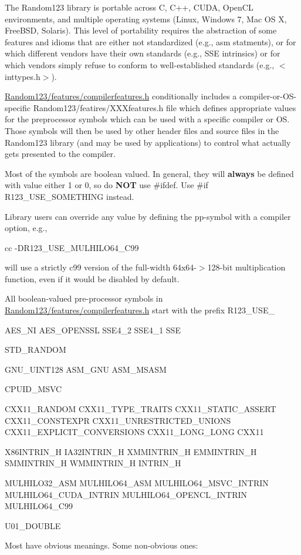 The Random123 library is portable across C, C++, C\+U\+DA, Open\+CL environments, and multiple operating systems (Linux, Windows 7, Mac OS X, Free\+B\+SD, Solaris). This level of portability requires the abstraction of some features and idioms that are either not standardized (e.\+g., asm statments), or for which different vendors have their own standards (e.\+g., S\+SE intrinsics) or for which vendors simply refuse to conform to well-\/established standards (e.\+g., $<$inttypes.\+h$>$).

\mbox{\hyperlink{compilerfeatures_8h_source}{Random123/features/compilerfeatures.\+h}} conditionally includes a compiler-\/or-\/\+O\+S-\/specific Random123/featires/\+X\+X\+Xfeatures.\+h file which defines appropriate values for the preprocessor symbols which can be used with a specific compiler or OS. Those symbols will then be used by other header files and source files in the Random123 library (and may be used by applications) to control what actually gets presented to the compiler.

Most of the symbols are boolean valued. In general, they will {\bfseries{always}} be defined with value either 1 or 0, so do {\bfseries{N\+OT}} use \#ifdef. Use \#if R123\+\_\+\+U\+S\+E\+\_\+\+S\+O\+M\+E\+T\+H\+I\+NG instead.

Library users can override any value by defining the pp-\/symbol with a compiler option, e.\+g., \begin{DoxyVerb}cc -DR123_USE_MULHILO64_C99 
\end{DoxyVerb}


will use a strictly c99 version of the full-\/width 64x64-\/$>$128-\/bit multiplication function, even if it would be disabled by default.

All boolean-\/valued pre-\/processor symbols in \mbox{\hyperlink{compilerfeatures_8h_source}{Random123/features/compilerfeatures.\+h}} start with the prefix R123\+\_\+\+U\+S\+E\+\_\+ \begin{DoxyVerb}         AES_NI
         AES_OPENSSL
         SSE4_2
         SSE4_1
         SSE

         STD_RANDOM

         GNU_UINT128
         ASM_GNU
         ASM_MSASM

         CPUID_MSVC

         CXX11_RANDOM
         CXX11_TYPE_TRAITS
         CXX11_STATIC_ASSERT
         CXX11_CONSTEXPR
         CXX11_UNRESTRICTED_UNIONS
         CXX11_EXPLICIT_CONVERSIONS
         CXX11_LONG_LONG
         CXX11 
   
         X86INTRIN_H
         IA32INTRIN_H
         XMMINTRIN_H
         EMMINTRIN_H
         SMMINTRIN_H
         WMMINTRIN_H
         INTRIN_H

         MULHILO32_ASM
         MULHILO64_ASM
         MULHILO64_MSVC_INTRIN
         MULHILO64_CUDA_INTRIN
         MULHILO64_OPENCL_INTRIN
         MULHILO64_C99

         U01_DOUBLE\end{DoxyVerb}
 Most have obvious meanings. Some non-\/obvious ones\+:


